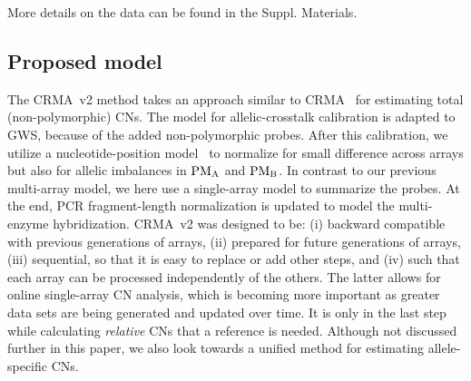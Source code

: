 \documentclass{bioinfo}
\newcommand{\GWS}{GWS\xspace}
\newcommand{\PMA}{\ensuremath{\textnormal{PM}_\textnormal{A}}\xspace}
\newcommand{\PMB}{\ensuremath{\textnormal{PM}_\textnormal{B}}\xspace}
\begin{document}
More details on the data can be found in the Suppl. Materials.


\subsection{Proposed model}

The CRMA~v2 method takes an approach similar to CRMA~\citep{BengtssonH_etal_2008a} for estimating total (non-polymorphic) CNs.  The model for allelic-crosstalk calibration is adapted to \GWS, because of the added non-polymorphic probes.  After this calibration, we utilize a nucleotide-position model~\citep{CarvalhoB_etal_2006} to normalize for small difference across arrays but also for allelic imbalances in \PMA and \PMB.  
In contrast to our previous multi-array model, we here use a single-array model to summarize the probes.  At the end, PCR fragment-length normalization is updated to model the multi-enzyme hybridization.
CRMA~v2 was designed to be:
(i) backward compatible with previous generations of arrays,
(ii) prepared for future generations of arrays, 
(iii) sequential, so that it is easy to replace or add other steps, and
(iv) such that each array can be processed independently of the others.
The latter allows for online single-array CN analysis, which is becoming more important as greater data sets are being generated and updated over time.
It is only in the last step while calculating \emph{relative} CNs that a reference is needed.
Although not discussed further in this paper, we also look towards a unified method for estimating allele-specific CNs.
\end{document}
